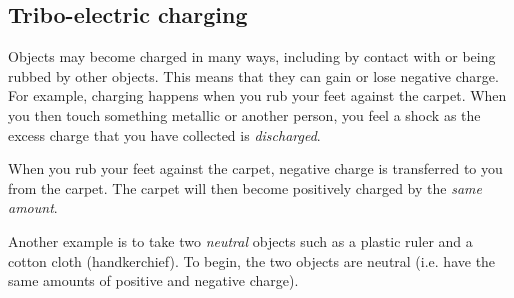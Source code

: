             \subsection{Tribo-electric charging}
            \nopagebreak
            \label{m38780*id200729}Objects may become charged in many ways, including by contact with or being rubbed by other objects. This means that they can gain or lose negative charge. For example, charging happens
when you rub your feet against the carpet. When you
then touch something metallic or another person, you feel a shock as
the excess charge that you have collected is \textsl{discharged}.\par 
{}
\label{m38780*id200752}When you rub your feet
against the carpet, negative charge is transferred to you
from the carpet. The carpet will then become positively
charged by the \textsl{same amount}.\par 
{}
      \label{m38780*id200762}Another example is to take two \textsl{neutral} objects such as a plastic ruler and a cotton cloth (handkerchief). To begin, the two objects are neutral (i.e. have the same amounts of positive and negative charge).\par 
      \label{m38780*id200774}
    \setcounter{subfigure}{0}
